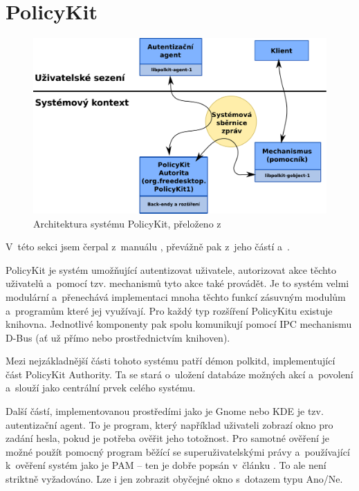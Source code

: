 \section{PolicyKit}
\begin{figure}[h]
    \centering
    \includegraphics[width=12cm]{obrazky/polkit-architecture-vector-cz.pdf}
    \caption{Architektura systému PolicyKit, přeloženo z~\cite{manpolkit1}}
    \label{fig:polkit_arch}
\end{figure}

V~této sekci jsem čerpal z~manuálu \cite{manpolkit_overview}, převážně pak z~jeho částí \cite{manpolkit1} a~\cite{manpklocalauth}.

PolicyKit je systém umožňující autentizovat uživatele, autorizovat akce těchto uživatelů a~pomocí tzv. mechanismů tyto akce také provádět. Je to systém velmi modulární a~přenechává implementaci mnoha těchto funkcí zásuvným modulům a~programům které jej využívají. Pro každý typ rozšíření PolicyKitu existuje knihovna. Jednotlivé komponenty pak spolu komunikují pomocí IPC mechanismu D-Bus (ať už přímo nebo prostřednictvím knihoven).

Mezi nejzákladnější části tohoto systému patří démon polkitd, implementující část PolicyKit Authority. Ta se stará o~uložení databáze možných akcí a~povolení a~slouží jako centrální prvek celého systému.

Další částí, implementovanou prostředími jako je Gnome nebo KDE je tzv. autentizační agent. To je program, který například uživateli zobrazí okno pro zadání hesla, pokud je potřeba ověřit jeho totožnost. Pro samotné ověření je možné použít pomocný program běžící se superuživatelskými právy a~používající k~ověření systém jako je PAM -- ten je dobře popsán v~článku \cite{rootpam}. To ale není striktně vyžadováno. Lze i jen zobrazit obyčejné okno s~dotazem typu Ano/Ne.

